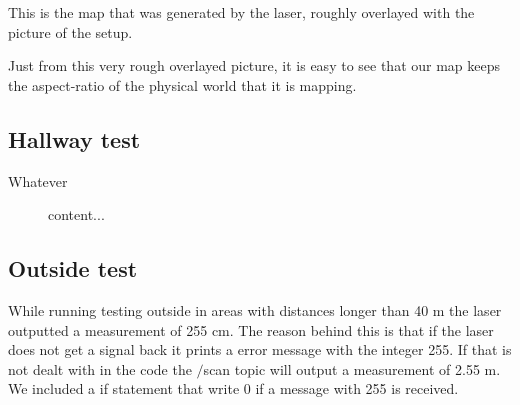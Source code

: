 This is the map that was generated by the laser, roughly overlayed with the picture of the setup.

Just from this very rough overlayed picture, it is easy to see that our map keeps the aspect-ratio of the physical world that it is mapping. 


\subsection{Hallway test}

Whatever

\begin{figure}[H]
	content...
\end{figure}

\subsection{Outside test}
While running testing outside in areas with distances longer than 40 m the laser outputted a measurement of 255 cm. The reason behind this is that if the laser does not get a signal back it prints a error message with the integer 255. If that is not dealt with in the code the $/$scan topic will output a measurement of 2.55 m. We included a if statement that write 0 if a message with 255 is received. 

